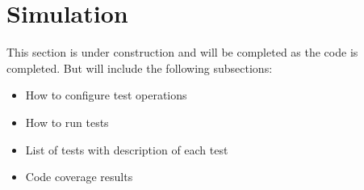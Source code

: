 \section{Simulation}

This section is under construction and will be completed as the code is
completed. But will include the following subsections:

\begin{itemize}
  \item How to configure test operations
  \item How to run tests
  \item List of tests with description of each test
  \item Code coverage results
\end{itemize}